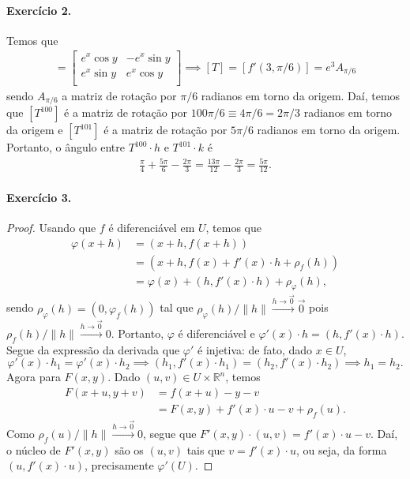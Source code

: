 \documentclass[12pt,a4paper]{article}
\newcommand{\R}{\mathbb{R}}
\begin{document}
\paragraph{Exercício 2.}
    Temos que
    \begin{align*}
        [f'(x,y)] = 
        \begin{bmatrix}
            e^x\cos y & -e^x\sin y \\
            e^x\sin y & e^x\cos y \\
        \end{bmatrix} 
        \implies
        [T] = [f'(3, \pi/6)] = 
        e^3A_{\pi/6}
    \end{align*}
    sendo $A_{\pi/6}$ a matriz de rotação por $\pi/6$ radianos em torno da origem. Daí, temos que $[T^{100}]$
    é a matriz de rotação por $100\pi/6 \equiv 4\pi/6 = 2\pi/3$ radianos em torno da origem e $[T^{101}]$ é
    a matriz de rotação por $5\pi/6$ radianos em torno da origem. Portanto, o ângulo entre $T^{100}\cdot h$ 
    e $T^{101}\cdot k$ é
    \begin{align*}
        \frac{\pi}{4} + \frac{5\pi}{6} - \frac{2\pi}{3} = \frac{13\pi}{12} - \frac{2\pi}{3} = \frac{5\pi}{12}.
    \end{align*}
\paragraph{Exercício 3.}
    \begin{proof}
        Usando que $f$ é diferenciável em $U$, temos que
        \begin{align*}
            \varphi(x+h) &= (x+h, f(x+h)) \\
                         &= (x+h, f(x) + f'(x)\cdot h + \rho_f(h)) \\
                         &= \varphi(x) + (h, f'(x)\cdot h) + \rho_{\varphi}(h),
        \end{align*}
        sendo $\rho_{\varphi}(h) = (0, \varphi_f(h))$ tal que 
        $\rho_{\varphi}(h)/\|h\| \xrightarrow{h\to \vec{0}} \vec{0}$ pois
        $\rho_f(h)/\|h\| \xrightarrow{h\to \vec{0}} 0$.
        Portanto, $\varphi$ é diferenciável e $\varphi'(x)\cdot h = (h, f'(x)\cdot h)$.
        Segue da expressão da derivada que $\varphi'$ é injetiva: de fato, dado $x\in U$,
        \begin{equation*}
            \varphi'(x)\cdot h_1 = \varphi'(x)\cdot h_2 
            \implies (h_1, f'(x)\cdot h_1) = (h_2, f'(x)\cdot h_2)
            \implies h_1 = h_2.
        \end{equation*}
        Agora para $F(x,y)$. Dado $(u,v)\in U\times\R^n$, temos
        \begin{align*}
            F(x+u, y+v) &= f(x+u) - y - v \\
                        &= F(x,y) + f'(x)\cdot u - v + \rho_f(u).
        \end{align*}
        Como $\rho_f(u)/\|h\| \xrightarrow{h\to\vec{0}} 0$, segue que $F'(x,y)\cdot (u,v) = f'(x)\cdot u - v$.
        Daí, o núcleo de $F'(x,y)$ são os $(u,v)$ tais que $v = f'(x)\cdot u$, ou seja, da forma
        $(u, f'(x)\cdot u)$, precisamente $\varphi'(U)$.
    \end{proof}
\end{document}
